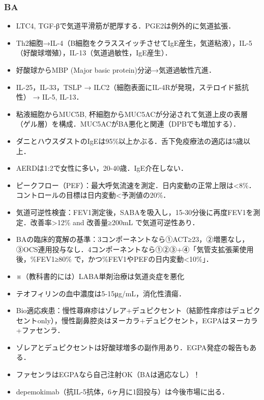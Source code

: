 \subsubsection{BA}

\begin{itemize}
\item LTC4, TGF-βで気道平滑筋が肥厚する．PGE2は例外的に気道拡張．
\item Th2細胞→IL-4（B細胞をクラススイッチさせてIgE産生，気道粘液），IL-5（好酸球増殖），IL-13（気道過敏性，IgE産生）． 
\item 好酸球からMBP (Major basic protein)分泌→気道過敏性亢進．
\item IL-25，IL-33，TSLP → ILC2（細胞表面にIL-4Rが発現，ステロイド抵抗性） → IL-5, IL-13．
\item 粘液細胞からMUC5B, 杯細胞からMUC5ACが分泌されて気道上皮の表層（ゲル層）を構成．MUC5ACがBA悪化と関連（DPBでも増加する）．
\item ダニとハウスダストのIgEは95\%以上かぶる．舌下免疫療法の適応は5歳以上．
\item AERDは1:2で女性に多い，20-40歳．IgE介在しない．
\item ピークフロー（PEF）：最大呼気流速を測定．日内変動の正常上限は<8\%．コントロールの目標は日内変動<予測値の20\%．
\item 気道可逆性検査：FEV1測定後，SABAを吸入し，15-30分後に再度FEV1を測定．改善率>12\% and 改善量≥200mL で気道可逆性あり．
\item BAの臨床的寛解の基準：3コンポーネントなら①ACT≥23，②増悪なし，③OCS連用投与なし．4コンポーネントなら①②③+④「気管支拡張薬使用後，\%FEV1≥80\% で，かつ\%FEV1やPEFの日内変動<10\%」．
\item ※（教科書的には）LABA単剤治療は気道炎症を悪化
\item テオフィリンの血中濃度は5-15μg/mL，消化性潰瘍．
\item Bio適応疾患：慢性蕁麻疹はゾレア+デュピクセント（結節性痒疹はデュピクセントonly），慢性副鼻腔炎はヌーカラ+デュピクセント，EGPAはヌーカラ+ファセンラ．
\item ゾレアとデュピクセントは好酸球増多の副作用あり．EGPA発症の報告もある．
\item ファセンラはEGPAなら自己注射OK（BAは適応なし）！
\item depemokimab（抗IL-5抗体，6ヶ月に1回投与）は今後市場に出る．

\end{itemize}

